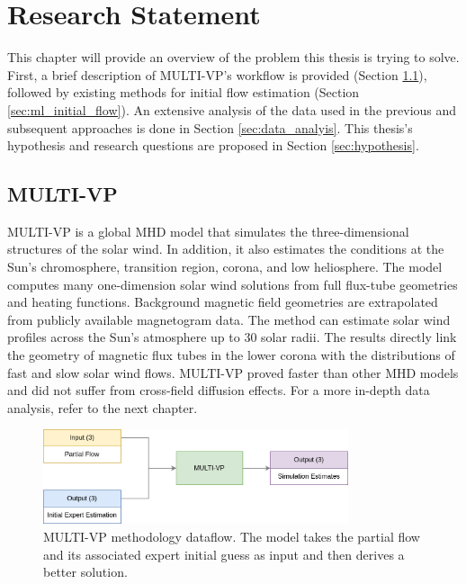 \chapter{Research Statement}\label{chap:research_proposal}

This chapter will provide an overview of the problem this thesis is trying to solve. First, a brief description of MULTI-VP's workflow is provided (Section \ref{sec:multivp}), followed by existing methods for initial flow estimation (Section \ref{sec:ml_initial_flow}).  An extensive analysis of the data used in the previous and subsequent approaches is done in Section \ref{sec:data_analyis}. This thesis's hypothesis and research questions are proposed in Section \ref{sec:hypothesis}. 

\section{MULTI-VP}\label{sec:multivp}

MULTI-VP \cite{pinto.rouillard_MultipleFluxtubeSolar_2017} is a global MHD model that simulates the three-dimensional structures of the solar wind. In addition, it also estimates the conditions at the Sun's chromosphere, transition region, corona, and low heliosphere. The model computes many one-dimension solar wind solutions from full flux-tube geometries and heating functions. Background magnetic field geometries are extrapolated from publicly available magnetogram data. The method can estimate solar wind profiles across the Sun's atmosphere up to 30 solar radii. The results directly link the geometry of magnetic flux tubes in the lower corona with the distributions of fast and slow solar wind flows. MULTI-VP proved faster than other MHD models and did not suffer from cross-field diffusion effects. For a more in-depth data analysis, refer to the next chapter.

\vspace{0.5cm}
\begin{figure}[]
\centering
\includegraphics[width=0.8\textwidth]{figures/multivp_method.png}
\caption[MULTI-VP methodology dataflow]{MULTI-VP methodology dataflow. The model takes the partial flow and its associated expert initial guess as input and then derives a better solution.\label{fig:multivp_method}}
\end{figure}

